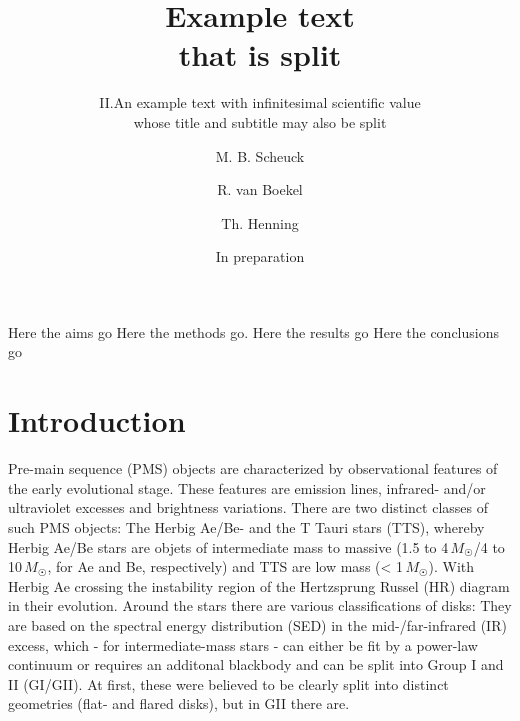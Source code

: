 \documentclass{aa}
\newcommand{\Msun}{\,$M_{\astrosun}$}
\begin{document}
\title{Example text\\ that is split}
\subtitle{II.\@ An example text with infinitesimal scientific value\\
whose title and subtitle may also be split}
\author{M. B. Scheuck
    \and R. van Boekel
\and Th. Henning}
 \date{In preparation}
\abstract{} {Here the aims go} {Here the methods go.} {Here the results go} {Here the conclusions go}
\maketitle

\section{Introduction}
Pre-main sequence (PMS) objects are characterized by observational features of
the early evolutional stage. These features are emission lines, infrared- and/or
ultraviolet excesses and brightness variations. There are two distinct classes
of such PMS objects: The Herbig Ae/Be- and the T Tauri stars (TTS), whereby
Herbig Ae/Be stars are objets of intermediate mass to massive (1.5 to 4\Msun/4 to
10\Msun, for Ae and Be, respectively) and TTS are low mass (<
1\Msun). With Herbig Ae crossing the instability region of the Hertzsprung Russel
(HR) diagram in their evolution\citet{Zwintz2008}.
Around the stars there are various classifications of disks: They are based on
the spectral energy distribution (SED) in the mid-/far-infrared (IR) excess,
which - for intermediate-mass stars - can either be fit by a power-law
continuum or requires an additonal blackbody and can be split into
Group I and II (GI/GII). At first, these were believed to be clearly
split into distinct geometries (flat- and flared disks), but in GII there are\citet{Garufi2017}.
\end{document}
